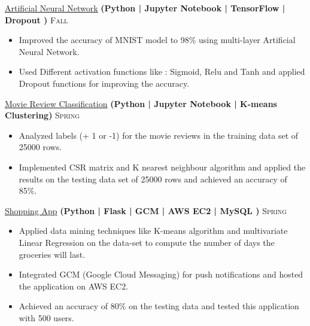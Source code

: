 \documentclass[10pt,a4paper]{article}
\begin{document}
{{\headedsection  %
  {\href{https://github.com/Dhrumil1808/ANN-tensorflow}{Artificial Neural Network}
  \textbf{
  \small{(Python | Jupyter Notebook | TensorFlow | Dropout )}}}
  {\textsc{ Fall }} {%
  
    {\bodytext
    {
    \begin{itemize}
        \item Improved the accuracy of MNIST model to 98\% using multi-layer Artificial Neural Network.
        \item Used Different activation functions like : Sigmoid, Relu and Tanh and applied Dropout functions for improving the accuracy.
        
    \end{itemize}}}
}


\headedsection  %
  {\href{https://github.com/Dhrumil1808/movie-review-classification}{Movie Review Classification}
  \textbf{
  \small{(Python | Jupyter Notebook | K-means Clustering)}}}
  {\textsc{Spring }} {%
  
    {\bodytext
    {
    \begin{itemize}
        \item  Analyzed labels (+ 1 or -1) for the  movie reviews in the training data set of 25000 rows.
        \item Implemented CSR matrix and K nearest neighbour algorithm and applied the results on the testing data set of 25000 rows and achieved an accuracy of 85\%.
    \end{itemize}}}
}


\headedsection  %
 {\href{https://github.com/Dhrumil1808/ShoppingElf}{Shopping App}
  \textbf{
  \small{(Python | Flask | GCM | AWS EC2 | MySQL )}}}
  {\textsc{Spring }} {%
  
    {\bodytext
    {
    \begin{itemize}
        \item Applied data mining techniques like K-means algorithm and multivariate Linear Regression on the data-set to compute the number of days the groceries will last.
        \item Integrated GCM (Google Cloud Messaging) for push notifications  and hosted  the application on AWS EC2.
        \item Achieved an accuracy of 80\% on the testing data and tested this application with 500 users.
        

\end{itemize}}}}}}
\end{document}
